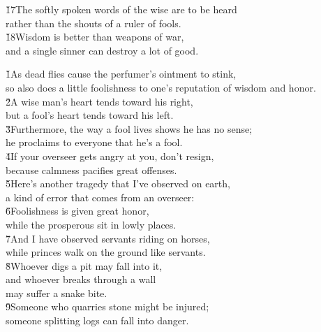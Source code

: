 \begin{poetry}
\poeml \v{17}The softly spoken words of the wise are to be heard \\
\poemll    rather than the shouts of a ruler of fools. \\
\poeml \v{18}Wisdom is better than weapons of war, \\
\poemll    and a single sinner can destroy a lot of good.
\end{poetry}

\begin{poetry}
\poeml {}
\v{1}As dead flies cause the perfumer's ointment to stink, \\
\poeml so also does a little foolishness to one's reputation of wisdom and honor. \\
\poeml \v{2}A wise man's heart tends toward his right, \\
\poemll    but a fool's heart tends toward his left. \\
\poeml \v{3}Furthermore, the way a fool lives shows he has no sense; \\
\poemll    he proclaims to everyone that he's a fool. \\
\poeml \v{4}If your overseer gets angry at you, don't resign, \\
\poemll    because calmness pacifies great offenses. \\
\poeml \v{5}Here's another tragedy that I've observed on earth, \\
\poemll    a kind of error that comes from an overseer: \\
\poeml \v{6}Foolishness is given great honor, \\
\poemll    while the prosperous sit in lowly places. \\
\poeml \v{7}And I have observed servants riding on horses, \\
\poemll    while princes walk on the ground like servants. \\
\poeml \v{8}Whoever digs a pit may fall into it, \\
\poemll    and whoever breaks through a wall \\
\poemlll       may suffer a snake bite. \\
\poeml \v{9}Someone who quarries stone might be injured; \\
\poemll    someone splitting logs can fall into danger. \\

\end{poetry}

